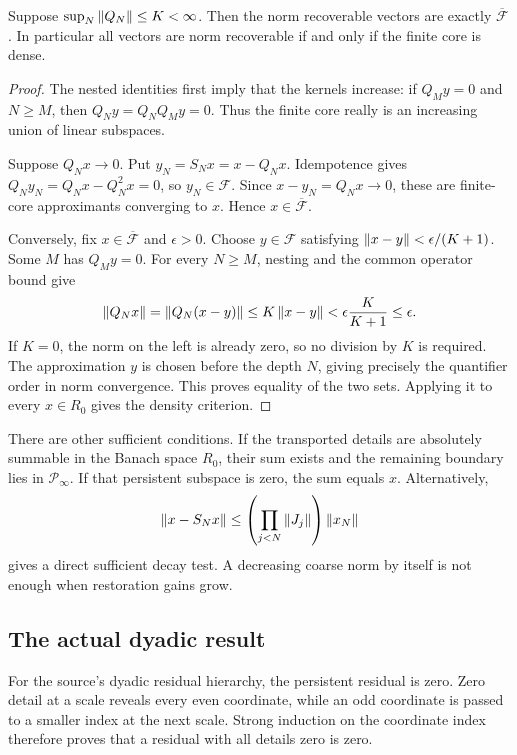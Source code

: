 \begin{theorem}\label{KS27}
Suppose \(\sup_N\left\lVert Q_N\right\rVert\le K<\infty\). Then the norm recoverable vectors are exactly \(\overline{\mathcal F}\). In particular all vectors are norm recoverable if and only if the finite core is dense.
\end{theorem}
\begin{proof}
The nested identities first imply that the kernels increase: if $Q_My=0$ and $N\ge M$, then $Q_Ny=Q_NQ_My=0$. Thus the finite core really is an increasing union of linear subspaces.

Suppose $Q_Nx\to0$. Put $y_N=S_Nx=x-Q_Nx$. Idempotence gives $Q_Ny_N=Q_Nx-Q_N^2x=0$, so $y_N\in\mathcal F$. Since $x-y_N=Q_Nx\to0$, these are finite-core approximants converging to $x$. Hence $x\in\overline{\mathcal F}$.

Conversely, fix $x\in\overline{\mathcal F}$ and $\epsilon>0$. Choose $y\in\mathcal F$ satisfying $\left\lVert x-y\right\rVert<\epsilon/(K+1)$. Some $M$ has $Q_My=0$. For every $N\ge M$, nesting and the common operator bound give
\[
 \left\lVert Q_Nx\right\rVert=\left\lVert Q_N(x-y)\right\rVert\le K\left\lVert x-y\right\rVert
 <\epsilon\frac{K}{K+1}\le\epsilon.
\]
If $K=0$, the norm on the left is already zero, so no division by $K$ is required. The approximation $y$ is chosen before the depth $N$, giving precisely the quantifier order in norm convergence. This proves equality of the two sets. Applying it to every $x\in R_0$ gives the density criterion.
\end{proof}
There are other sufficient conditions. If the transported details are absolutely summable in the Banach space \(R_0\), their sum exists and the remaining boundary lies in \(\mathcal P_\infty\). If that persistent subspace is zero, the sum equals \(x\). Alternatively,
\[
 \left\lVert x-S_Nx\right\rVert\le\left(\prod_{j<N}\left\lVert J_j\right\rVert\right)\left\lVert x_N\right\rVert
\]
gives a direct sufficient decay test. A decreasing coarse norm by itself is not enough when restoration gains grow.

\subsection{The actual dyadic result}
For the source's dyadic residual hierarchy, the persistent residual is zero. Zero detail at a scale reveals every even coordinate, while an odd coordinate is passed to a smaller index at the next scale. Strong induction on the coordinate index therefore proves that a residual with all details zero is zero.

